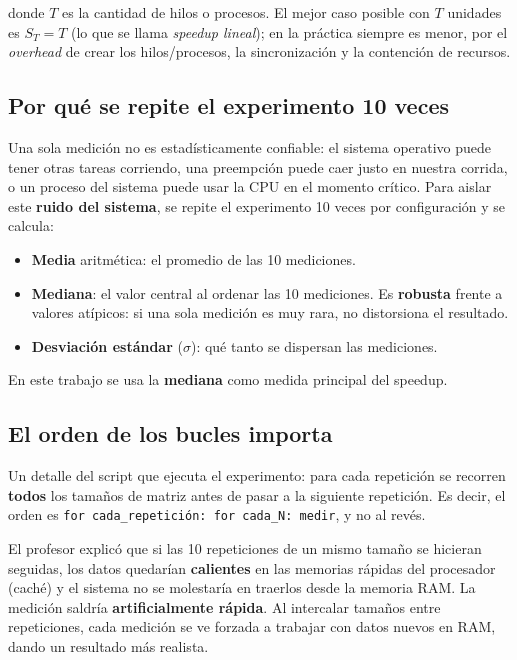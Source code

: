 donde $T$ es la cantidad de hilos o procesos. El mejor caso posible con $T$ unidades es $S_T = T$ (lo que se llama \textit{speedup lineal}); en la práctica siempre es menor, por el \textit{overhead} de crear los hilos/procesos, la sincronización y la contención de recursos.

\subsection{Por qué se repite el experimento 10 veces}

Una sola medición no es estadísticamente confiable: el sistema operativo puede tener otras tareas corriendo, una preempción puede caer justo en nuestra corrida, o un proceso del sistema puede usar la CPU en el momento crítico. Para aislar este \textbf{ruido del sistema}, se repite el experimento 10 veces por configuración y se calcula:

\begin{itemize}
    \item \textbf{Media} aritmética: el promedio de las 10 mediciones.
    \item \textbf{Mediana}: el valor central al ordenar las 10 mediciones. Es \textbf{robusta} frente a valores atípicos: si una sola medición es muy rara, no distorsiona el resultado.
    \item \textbf{Desviación estándar} ($\sigma$): qué tanto se dispersan las mediciones.
\end{itemize}

En este trabajo se usa la \textbf{mediana} como medida principal del speedup.

\subsection{El orden de los bucles importa}

Un detalle del script que ejecuta el experimento: para cada repetición se recorren \textbf{todos} los tamaños de matriz antes de pasar a la siguiente repetición. Es decir, el orden es \texttt{for cada\_repetición: for cada\_N: medir}, y no al revés.

El profesor explicó que si las 10 repeticiones de un mismo tamaño se hicieran seguidas, los datos quedarían \textbf{calientes} en las memorias rápidas del procesador (caché) y el sistema no se molestaría en traerlos desde la memoria RAM. La medición saldría \textbf{artificialmente rápida}. Al intercalar tamaños entre repeticiones, cada medición se ve forzada a trabajar con datos nuevos en RAM, dando un resultado más realista.

